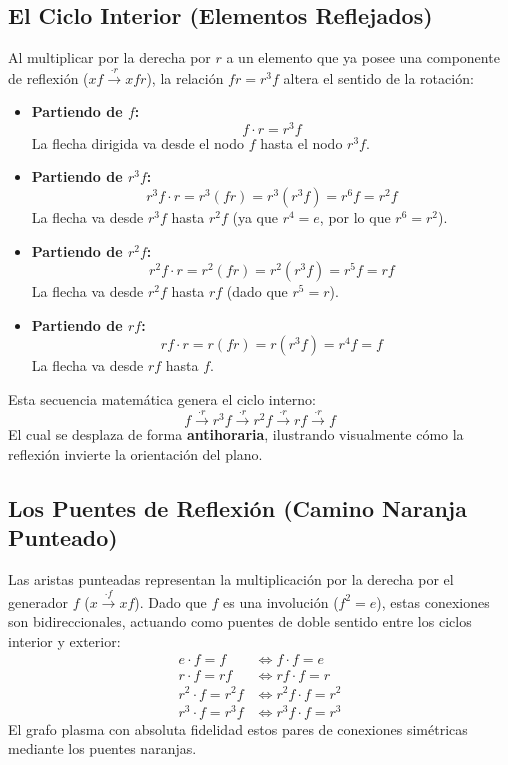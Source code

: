 \documentclass{article}
\begin{document}
\subsection{El Ciclo Interior (Elementos Reflejados)}
Al multiplicar por la derecha por $r$ a un elemento que ya posee una componente de reflexión ($xf \xrightarrow{\cdot r} xfr$), la relación $fr = r^3f$ altera el sentido de la rotación:
\begin{itemize}
    \item \textbf{Partiendo de $f$:} 
    \[ f \cdot r = r^3f \]
    La flecha dirigida va desde el nodo $f$ hasta el nodo $r^3f$.
    
    \item \textbf{Partiendo de $r^3f$:} 
    \[ r^3f \cdot r = r^3(fr) = r^3(r^3f) = r^6f = r^2f \]
    La flecha va desde $r^3f$ hasta $r^2f$ (ya que $r^4 = e$, por lo que $r^6 = r^2$).
    
    \item \textbf{Partiendo de $r^2f$:} 
    \[ r^2f \cdot r = r^2(fr) = r^2(r^3f) = r^5f = rf \]
    La flecha va desde $r^2f$ hasta $rf$ (dado que $r^5 = r$).
    
    \item \textbf{Partiendo de $rf$:} 
    \[ rf \cdot r = r(fr) = r(r^3f) = r^4f = f \]
    La flecha va desde $rf$ hasta $f$.
\end{itemize}

Esta secuencia matemática genera el ciclo interno:
\[
f \xrightarrow{\cdot r} r^3f \xrightarrow{\cdot r} r^2f \xrightarrow{\cdot r} rf \xrightarrow{\cdot r} f
\]
El cual se desplaza de forma \textbf{antihoraria}, ilustrando visualmente cómo la reflexión invierte la orientación del plano.

\subsection{Los Puentes de Reflexión (Camino Naranja Punteado)}
Las aristas punteadas representan la multiplicación por la derecha por el generador $f$ ($x \xrightarrow{\cdot f} xf$). Dado que $f$ es una involución ($f^2 = e$), estas conexiones son bidireccionales, actuando como puentes de doble sentido entre los ciclos interior y exterior:
\begin{align*}
    e \cdot f = f &\iff f \cdot f = e \\
    r \cdot f = rf &\iff rf \cdot f = r \\
    r^2 \cdot f = r^2f &\iff r^2f \cdot f = r^2 \\
    r^3 \cdot f = r^3f &\iff r^3f \cdot f = r^3
\end{align*}
El grafo plasma con absoluta fidelidad estos pares de conexiones simétricas mediante los puentes naranjas.
\end{document}
